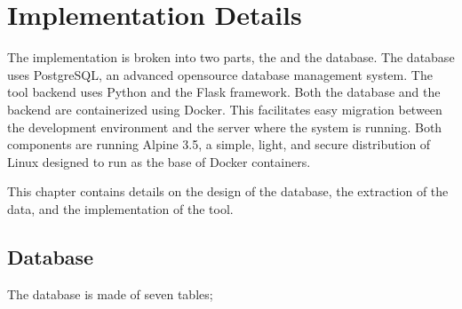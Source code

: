 \chapter{Implementation Details}\label{chap:implementation_details}

The implementation is broken into two parts, the \tool{} and the
database.
The database uses PostgreSQL, an advanced opensource database management
system. The tool backend uses Python and the Flask framework.
Both the database and the \tool{} backend are containerized using
Docker. This facilitates easy migration between the development
environment and the server where the system is running. Both components
are running Alpine 3.5, a simple, light, and secure distribution of
Linux designed to run as the base of Docker containers.

This chapter contains details on the design of the database, the
extraction of the data, and the implementation of the tool.

\section{Database}\label{sec:database}

The database is made of seven tables;

